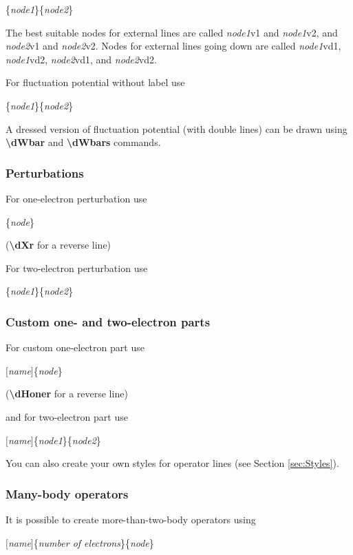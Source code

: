 \documentclass[a4paper]{article}
\newcommand{\myind}{\hspace{10pt}}
\begin{document}
\myind{\bf \textbackslash dW}\{{\it node1}\}\{{\it node2}\}

The best suitable nodes for external lines are called {\it node1}v1 and {\it node1}v2, 
and {\it node2}v1 and {\it node2}v2.
Nodes for external lines going down are called {\it node1}vd1, {\it node1}vd2, 
{\it node2}vd1, and {\it node2}vd2.

For fluctuation potential without label use

\myind{\bf \textbackslash dWs}\{{\it node1}\}\{{\it node2}\}

A dressed version of fluctuation potential (with double lines) can be drawn
using {\bf \textbackslash dWbar} and {\bf \textbackslash dWbars} commands.

\subsubsection{Perturbations}

For one-electron perturbation use

\myind{\bf \textbackslash dX}\{{\it node}\}

({\bf \textbackslash dXr} for a reverse line)

For two-electron perturbation use

\myind{\bf \textbackslash dXtwo}\{{\it node1}\}\{{\it node2}\}

\subsubsection{Custom one- and two-electron parts}

For custom one-electron part use

\myind{\bf \textbackslash dHone}$[${\it name}$]$\{{\it node}\}

({\bf \textbackslash dHoner} for a reverse line)

and for two-electron part use

\myind{\bf \textbackslash dHtwo}$[${\it name}$]$\{{\it node1}\}\{{\it node2}\}

You can also create your own styles for operator lines (see Section \ref{sec:Styles}).

\subsubsection{Many-body operators}

It is possible to create more-than-two-body operators using 

\myind{\bf \textbackslash dHmany}$[${\it name}$]$\{{\it number of electrons}\}\{{\it node}\}
\end{document}
